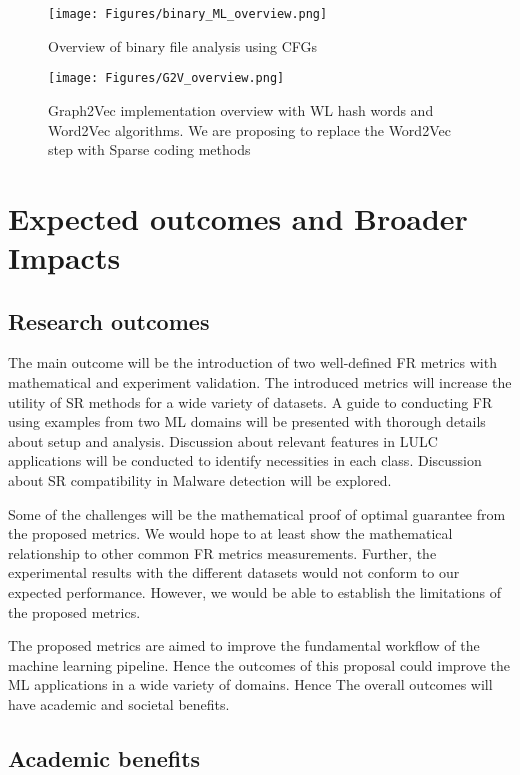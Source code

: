 \documentclass[11pt]{article}
\begin{document}
\begin{figure*}[!t]%
\centering
\texttt{[image: Figures/binary\_ML\_overview.png]}
\caption{Overview of binary file analysis using CFGs}%
\label{fig: binary_ML}%
\end{figure*}

\begin{figure*}[!t]%
\centering
\texttt{[image: Figures/G2V\_overview.png]}
\caption{Graph2Vec implementation overview with WL hash words and Word2Vec algorithms. We are proposing to replace the Word2Vec step with Sparse coding methods}%
\label{fig: G2V}%
\end{figure*}

\section{Expected outcomes and Broader Impacts}

\subsection{Research outcomes}

The main outcome will be the introduction of two well-defined FR metrics with mathematical and experiment validation. The introduced metrics will increase the utility of SR methods for a wide variety of datasets. A guide to conducting FR using examples from two ML domains will be presented with thorough details about setup and analysis. Discussion about relevant features in LULC applications will be conducted to identify necessities in each class. Discussion about SR compatibility in Malware detection will be explored. 

Some of the challenges will be the mathematical proof of optimal guarantee from the proposed metrics. We would hope to at least show the mathematical relationship to other common FR metrics measurements. Further, the experimental results with the different datasets would not conform to our expected performance. However, we would be able to establish the limitations of the proposed metrics. 

The proposed metrics are aimed to improve the fundamental workflow of the machine learning pipeline. Hence the outcomes of this proposal could improve the ML applications in a wide variety of domains. Hence The overall outcomes will have academic and societal benefits.     
\subsection{Academic benefits}
\end{document}
